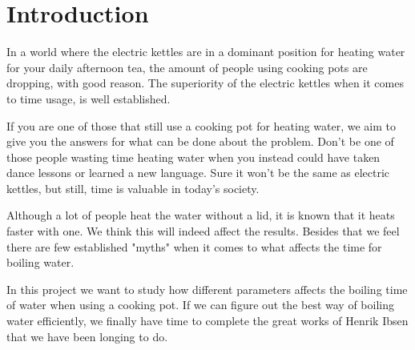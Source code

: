 \section*{Introduction}
In a world where the electric kettles are in a dominant position for heating water for your daily afternoon tea, the amount of people using cooking pots are dropping, with good reason. The superiority of the electric kettles when it comes to time usage, is well established.

If you are one of those that still use a cooking pot for heating water, we aim to give you the answers for what can be done about the problem. Don't be one of those people wasting time heating water when you instead could have taken dance lessons or learned a new language. Sure it won't be the same as electric kettles, but still, time is valuable in today's society.

Although a lot of people heat the water without a lid, it is known that it heats faster with one. We think this will indeed affect the results. Besides that we feel there are few established "myths" when it comes to what affects the time for boiling water.

In this project we want to study how different parameters affects the boiling time of water when using a cooking pot. If we can figure out the best way of boiling water efficiently, we finally have time to complete the great works of Henrik Ibsen that we have been longing to do.